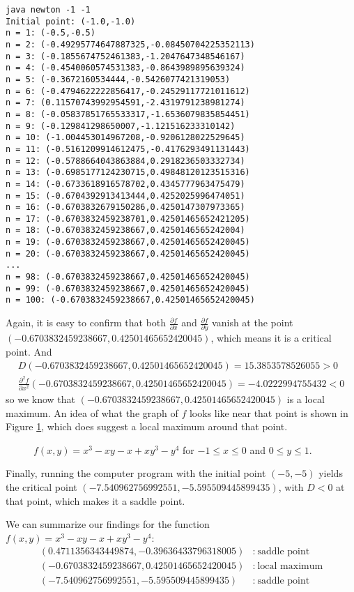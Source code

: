 \begin{exmp}
\begin{verbatim}
java newton -1 -1
Initial point: (-1.0,-1.0)
n = 1: (-0.5,-0.5)
n = 2: (-0.49295774647887325,-0.08450704225352113)
n = 3: (-0.1855674752461383,-1.2047647348546167)
n = 4: (-0.4540060574531383,-0.8643989895639324)
n = 5: (-0.3672160534444,-0.5426077421319053)
n = 6: (-0.4794622222856417,-0.24529117721011612)
n = 7: (0.11570743992954591,-2.4319791238981274)
n = 8: (-0.05837851765533317,-1.6536079835854451)
n = 9: (-0.129841298650007,-1.121516233310142)
n = 10: (-1.004453014967208,-0.9206128022529645)
n = 11: (-0.5161209914612475,-0.4176293491131443)
n = 12: (-0.5788664043863884,0.2918236503332734)
n = 13: (-0.6985177124230715,0.49848120123515316)
n = 14: (-0.6733618916578702,0.4345777963475479)
n = 15: (-0.6704392913413444,0.4252025996474051)
n = 16: (-0.6703832679150286,0.4250147307973365)
n = 17: (-0.6703832459238701,0.42501465652421205)
n = 18: (-0.6703832459238667,0.4250146565242004)
n = 19: (-0.6703832459238667,0.42501465652420045)
n = 20: (-0.6703832459238667,0.42501465652420045)
...
n = 98: (-0.6703832459238667,0.42501465652420045)
n = 99: (-0.6703832459238667,0.42501465652420045)
n = 100: (-0.6703832459238667,0.42501465652420045)
\end{verbatim}

Again, it is easy to confirm that both $\frac{\partial f}{\partial x}$ and $\frac{\partial f}{\partial y}$ vanish
at the point\\$(-0.6703832459238667,0.42501465652420045)$, which means it is a critical point. 
And
\begin{gather*}
 D(-0.6703832459238667,0.42501465652420045) = 15.3853578526055 > 0\\
 \frac{\partial^2 f}{\partial x^2}(-0.6703832459238667,0.42501465652420045) = -4.0222994755432 < 0
\end{gather*}
so we know that $(-0.6703832459238667,0.42501465652420045)$ is a local maximum. An idea of what the graph of $f$ looks
like near that point is shown in Figure \ref{fig:newtonmax}, which does suggest a local maximum around that point.

\begin{figure}[h]
 \begin{center}
  
 \end{center}
 \caption[]{\quad $f(x,y) = x^3 - xy - x + xy^3 - y^4$ for $-1 \le x \le 0$ and $0 \le y \le 1$.}
 \label{fig:newtonmax}
\end{figure}

Finally, running the computer program with the initial point $(-5,-5)$ yields the critical point
$(-7.540962756992551,-5.595509445899435)$, with $D < 0$ at that point, which makes it a saddle point.

We can summarize our findings for the function $f(x,y) = x^3 - xy - x + xy^3 - y^4$:
\begin{align*}
 (0.4711356343449874,-0.39636433796318005)&:~ \text{saddle point}\\
 (-0.6703832459238667,0.42501465652420045)&:~ \text{local maximum}\\
 (-7.540962756992551,-5.595509445899435)&:~ \text{saddle point}
\end{align*}
\end{exmp}
